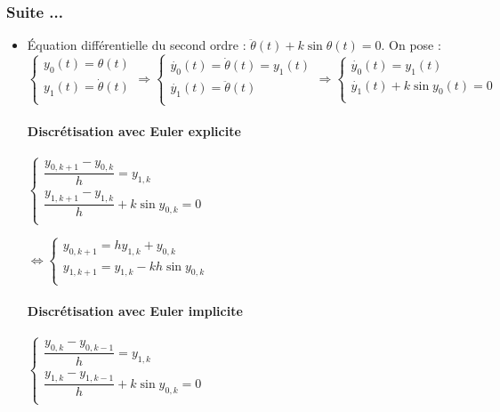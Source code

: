 \subsubsection{Suite ...}
\begin{itemize}[label=,font=\color{red}] 
\item Équation différentielle du second ordre : $\ddot{\theta}(t) + k \sin \theta(t) = 0$.
On pose : 
$$
\left\{
\begin{array}{l}
y_0(t) = \theta(t) \\
y_1(t) = \dot{\theta}(t) \\
\end{array}
\right. 
\Rightarrow 
\left\{
\begin{array}{l}
\dot{y_0}(t) = \dot{\theta}(t) = y_1(t) \\
\dot{y_1}(t) = \ddot{\theta}(t) \\
\end{array}
\right.
\Rightarrow 
\left\{
\begin{array}{l}
\dot{y_0}(t) = y_1(t) \\
\dot{y_1}(t) + k \sin y_0 (t) = 0 \\
\end{array}
\right.
$$



\paragraph*{Discrétisation avec Euler explicite}

$
\left\{
\begin{array}{l}
\dfrac{y_{0,k+1}-y_{0,k}}{h} = y_{1,k} \\
\dfrac{y_{1,k+1}-y_{1,k}}{h} + k \sin y_{0,k} = 0 \\
\end{array}
\right.$

$\Leftrightarrow 
\left\{
\begin{array}{l}
y_{0,k+1} = h y_{1,k} +y_{0,k} \\
y_{1,k+1} = y_{1,k} - kh \sin y_{0,k} \\
\end{array}
\right.$

\paragraph*{Discrétisation avec Euler implicite}

$
\left\{
\begin{array}{l}
\dfrac{y_{0,k}-y_{0,k-1}}{h} = y_{1,k} \\
\dfrac{y_{1,k}-y_{1,k-1}}{h} + k \sin y_{0,k} = 0 \\
\end{array}
\right.$


\end{itemize}
